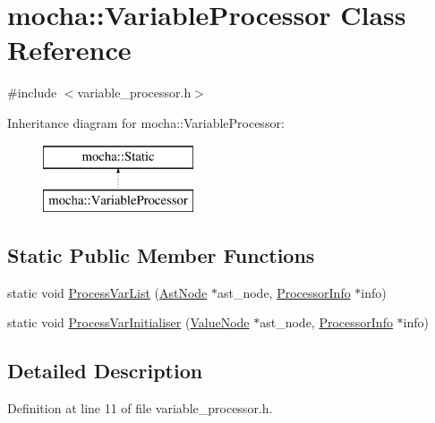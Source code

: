 \hypertarget{classmocha_1_1_variable_processor}{
\section{mocha::VariableProcessor Class Reference}
\label{classmocha_1_1_variable_processor}
}


{\ttfamily \#include $<$variable\_\-processor.h$>$}

Inheritance diagram for mocha::VariableProcessor:\begin{figure}[H]
\begin{center}
\leavevmode
\includegraphics[height=2.000000cm]{classmocha_1_1_variable_processor}
\end{center}
\end{figure}
\subsection*{Static Public Member Functions}
\begin{DoxyCompactItemize}
\item 
static void \hyperlink{classmocha_1_1_variable_processor_a72cc6efb1ddac42a194ae4acc43ce6c3}{ProcessVarList} (\hyperlink{classmocha_1_1_ast_node}{AstNode} $\ast$ast\_\-node, \hyperlink{classmocha_1_1_processor_info}{ProcessorInfo} $\ast$info)
\item 
static void \hyperlink{classmocha_1_1_variable_processor_ad9d290f91f13aac33cfebf85d2c8904e}{ProcessVarInitialiser} (\hyperlink{classmocha_1_1_value_node}{ValueNode} $\ast$ast\_\-node, \hyperlink{classmocha_1_1_processor_info}{ProcessorInfo} $\ast$info)
\end{DoxyCompactItemize}


\subsection{Detailed Description}


Definition at line 11 of file variable\_\-processor.h.



